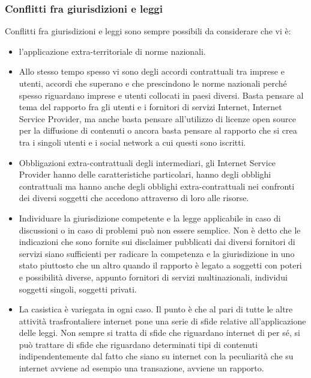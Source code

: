     \subsubsection{Conflitti fra giurisdizioni e leggi}
    Conflitti fra giurisdizioni e leggi sono sempre possibili da considerare che vi è:
    \begin{itemize}
        \item l'applicazione extra-territoriale di norme nazionali. 
        \item Allo stesso tempo spesso vi sono degli accordi contrattuali tra imprese e utenti, accordi che superano e che prescindono le norme nazionali perché spesso riguardano imprese e utenti collocati in paesi diversi. Basta pensare al tema del rapporto fra gli utenti e i fornitori di servizi Internet, Internet Service Provider, ma anche basta pensare all'utilizzo di licenze open source per la diffusione di contenuti o ancora basta pensare al rapporto che si crea tra i singoli utenti e i social network a cui questi sono iscritti. 
        \item Obbligazioni extra-contrattuali degli intermediari, gli Internet Service Provider hanno delle caratteristiche particolari, hanno degli obblighi contrattuali ma hanno anche degli obblighi extra-contrattuali nei confronti dei diversi soggetti che accedono attraverso di loro alle risorse. 
        \item Individuare la giurisdizione competente e la legge applicabile in caso di discussioni o in caso di problemi può non essere semplice. Non è detto che le indicazioni che sono fornite sui disclaimer pubblicati dai diversi fornitori di servizi siano sufficienti per radicare la competenza e la giurisdizione in uno stato piuttosto che un altro quando il rapporto è legato a soggetti con poteri e possibilità diverse, appunto fornitori di servizi multinazionali, individui soggetti singoli, soggetti privati. 
        \item La casistica è variegata in ogni caso. Il punto è che al pari di tutte le altre attività trasfrontaliere internet pone una serie di sfide relative all'applicazione delle leggi. Non sempre si tratta di sfide che riguardano internet di per sé, si può trattare di sfide che riguardano determinati tipi di contenuti indipendentemente dal fatto che siano su internet con la peculiarità che su internet avviene ad esempio una transazione, avviene un rapporto.\par
        \end{itemize}
